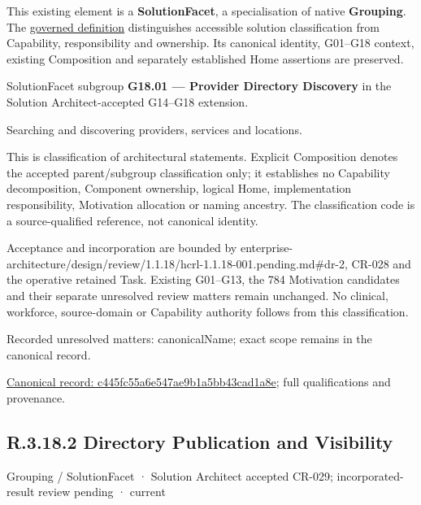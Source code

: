 This existing element is a \textbf{SolutionFacet}, a specialisation of native
\textbf{Grouping}. The \href{\detokenize{../../../../../../../governance/continuum-representation.md#solutionfacet-classification--1119-candidate}}{governed definition}
distinguishes accessible solution classification from Capability, responsibility
and ownership. Its canonical identity, G01–G18 context, existing Composition
and separately established Home assertions are preserved.



SolutionFacet subgroup \textbf{G18.01 — Provider Directory Discovery} in the Solution Architect-accepted G14–G18 extension.



Searching and discovering providers, services and locations.



This is classification of architectural statements. Explicit Composition denotes the accepted parent/subgroup classification only; it establishes no Capability decomposition, Component ownership, logical Home, implementation responsibility, Motivation allocation or naming ancestry. The classification code is a source-qualified reference, not canonical identity.



Acceptance and incorporation are bounded by enterprise-architecture/design/review/1.1.18/hcrl-1.1.18-001.pending.md\#dr-2, CR-028 and the operative retained Task. Existing G01–G13, the 784 Motivation candidates and their separate unresolved review matters remain unchanged. No clinical, workforce, source-domain or Capability authority follows from this classification.


{\small Recorded unresolved matters: canonicalName; exact scope remains in the canonical record.}\par
{\footnotesize \href{../../../../../../../continuum/grouping/c445fc55a6e547ae9b1a5bb43cad1a8e.md}{Canonical record: c445fc55a6e547ae9b1a5bb43cad1a8e}; full qualifications and provenance.}\par
\subsection*{R.3.18.2 Directory Publication and Visibility}
\label{navigation:R.3.18.2}

\label{element:b6a20afe29624f73906e5e852d6f2fbf}
{\small Grouping / SolutionFacet · Solution Architect accepted CR-029; incorporated-result review pending · current}\par

